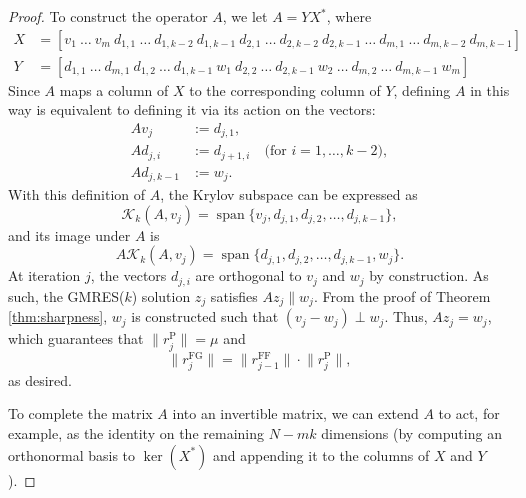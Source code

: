\documentclass{siamart251216}
\DeclareMathOperator{\spn}{span}
\begin{document}
{\begin{proof}
    To construct the operator $A$, we let $A = Y X^*$, where
    \begin{align*}
        X & = [v_1 \ \dots \ v_{m} \ d_{1,1} \ \dots \ d_{1,k-2} \ d_{1,k-1} \ d_{2,1} \ \dots \ d_{2,k-2} \ d_{2,k-1} \ \dots \ d_{m,1} \ \dots \ d_{m,k-2} \ d_{m,k-1} ] \\
        Y & = [d_{1,1} \ \dots \ d_{m,1} \ d_{1,2} \ \dots \ d_{1,k-1} \ w_{1} \ d_{2,2} \ \dots \ d_{2,k-1} \ w_{2} \ \dots \ d_{m,2} \ \dots \ d_{m,k-1} \ w_{m}]
    \end{align*}
    Since $A$ maps a column of $X$ to the corresponding column of $Y$, defining $A$ in this way is equivalent to defining it via its action on the vectors:
    \begin{align*}
        A v_j       & := d_{j,1},                                          \\
        A d_{j,i}   & := d_{j+1,i} \quad \text{(for $i = 1, \dots, k-2$)}, \\
        A d_{j,k-1} & := w_j.
    \end{align*}
    With this definition of $A$, the Krylov subspace can be expressed as
    $$ \mathcal{K}_k(A, v_j) = \spn\{v_j, d_{j,1}, d_{j,2}, \dots, d_{j,k-1}\}, $$
    and its image under $A$ is
    $$ A \mathcal{K}_k(A, v_j) = \spn\{d_{j,1}, d_{j,2}, \dots, d_{j,k-1}, w_j\}. $$
    At iteration $j$, the vectors $d_{j,i}$ are orthogonal to $v_j$ and $w_j$ by construction. As such, the GMRES($k$) solution $z_j$ satisfies $Az_j \parallel w_j$. From the proof of Theorem \ref{thm:sharpness}, $w_j$ is constructed such that $(v_j - w_j) \perp w_j$. Thus, $Az_j = w_j$, which guarantees that $\|r_j^{\mathrm{P}}\| = \mu$ and $$\big\| r_j^{\mathrm{FG}} \big\| = \big\| r_{j-1}^{\mathrm{FF}} \big\| \cdot \big\| r_{j}^{\mathrm{P}} \big\|,$$ as desired.



    To complete the matrix $A$ into an invertible matrix,
    we can extend $A$ to act, for example, as the identity on the remaining $N - mk$ dimensions (by computing an orthonormal basis to $\ker(X^*)$ and appending it to the columns of $X$ and $Y$). 
\end{proof}

}
\end{document}
